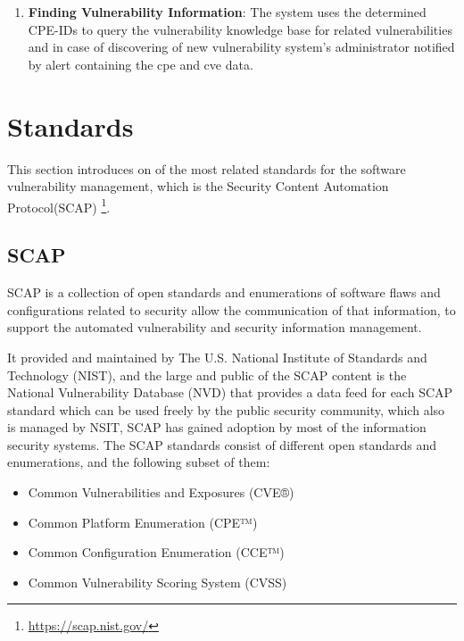 \documentclass{llncs}
\begin{document}
\begin{enumerate}
   \item \textbf{Finding Vulnerability Information}: The system uses the determined CPE-IDs to query the vulnerability knowledge base for related vulnerabilities and in case of discovering of new vulnerability system's administrator notified by alert containing the cpe and cve data.      
   
 
 \end{enumerate}



\section{Standards}
This section introduces on of the most related standards for the software vulnerability management, which is the Security Content Automation Protocol(SCAP) \footnote{\url{https://scap.nist.gov/}}.


\subsection{SCAP}

\par SCAP is a collection of open standards and enumerations of software flaws and configurations related to security allow the communication of that information, to support the automated vulnerability and security information management. \par   
 It provided and maintained by The U.S. National Institute of Standards and Technology (NIST)\cite{nsit}, and the large and public of the SCAP content is the National Vulnerability Database (NVD)\cite{nvd} that provides a data feed for each SCAP standard which can be used freely by the public security community, which also is managed by NSIT, SCAP has gained adoption by most of the information security systems.  
 The SCAP standards consist of different open standards and enumerations, and the following subset of them:
 
 \begin{itemize}
 \item Common Vulnerabilities and Exposures (CVE®)
 \item Common Platform Enumeration (CPE™)
 \item  Common Configuration Enumeration (CCE™)
 \item Common Vulnerability Scoring System (CVSS)
 \end{itemize}
 
\end{document}
